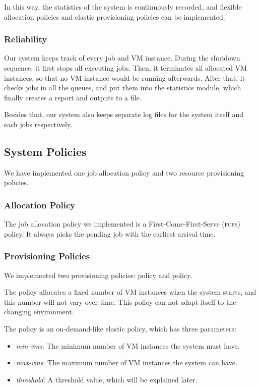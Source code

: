 In this way, the statistics of the system is continuously recorded,
and flexible allocation policies and elastic provisioning policies can
be implemented.


\subsubsection{Reliability}
Our system keeps track of every job and VM instance. During the
shutdown sequence, it first stops all executing jobs. Then, it
terminates all allocated VM instances, so that no VM instance would be
running afterwards. After that, it checks jobs in all the queues, and
put them into the statistics module, which finally creates a report
and outputs to a file.

Besides that, our system also keeps separate log files for the system
itself and each jobs respectively.


\subsection{System Policies}
We have implemented one job allocation policy and two resource
provisioning policies.

\subsubsection{Allocation Policy}
The job allocation policy we implemented is a First-Come-First-Serve
(\textsc{fcfs}) policy. It always picks the pending job with the
earliest arrival time.

\subsubsection{Provisioning Policies}
We implemented two provisioning policies: \policystatic{} policy and
\policysimpleelastic{} policy.

The \policystatic{} policy allocates a fixed number of VM instances when the
system starts, and this number will not vary over time. This policy
can not adapt itself to the changing environment.

The \policysimpleelastic{} policy is an on-demand-like elastic policy, which has
three parameters:

\begin{itemize}
\item \emph{min-vms}: The minimum number of VM instances the system
  must have.
\item \emph{max-vms}: The maximum number of VM instances the system can
  have.
\item \emph{threshold}: A threshold value, which will be explained
  later.
\end{itemize}

